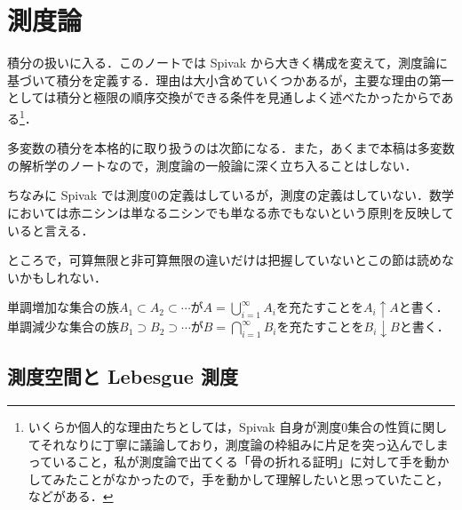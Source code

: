 \section{測度論}

積分の扱いに入る．このノートでは Spivak から大きく構成を変えて，測度論に基づいて積分を定義する．理由は大小含めていくつかあるが，主要な理由の第一としては積分と極限の順序交換ができる条件を見通しよく述べたかったからである\footnote{いくらか個人的な理由たちとしては，Spivak 自身が測度0集合の性質に関してそれなりに丁寧に議論しており，測度論の枠組みに片足を突っ込んでしまっていること，私が測度論で出てくる「骨の折れる証明」に対して手を動かしてみたことがなかったので，手を動かして理解したいと思っていたこと，などがある．}．

多変数の積分を本格的に取り扱うのは次節になる．また，あくまで本稿は多変数の解析学のノートなので，測度論の一般論に深く立ち入ることはしない．

\begin{dig}
ちなみに Spivak では測度0の定義はしているが，測度の定義はしていない．数学においては赤ニシンは単なるニシンでも単なる赤でもないという原則を反映していると言える．
\end{dig}

\begin{que}
ところで，可算無限と非可算無限の違いだけは把握していないとこの節は読めないかもしれない．
\end{que}

\begin{defi}
単調増加な集合の族$A_1 \subset A_2 \subset \cdots$が$A = \bigcup_{i=1}^\infty A_i$を充たすことを$A_i \uparrow A$と書く．単調減少な集合の族$B_1 \supset B_2 \supset \cdots$が$B = \bigcap_{i=1}^\infty B_i$を充たすことを$B_i \downarrow B$と書く．
\end{defi}

\subsection{測度空間と Lebesgue 測度}

